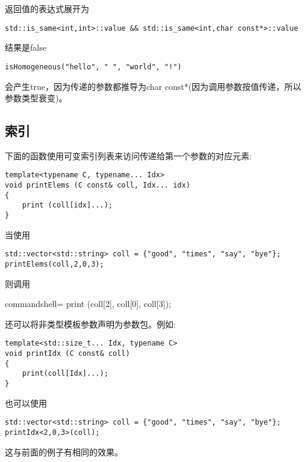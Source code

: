 返回值的表达式展开为

\begin{lstlisting}[style=styleCXX]
std::is_same<int,int>::value && std::is_same<int,char const*>::value
\end{lstlisting}

结果是false

\begin{lstlisting}[style=styleCXX]
isHomogeneous("hello", " ", "world", "!")
\end{lstlisting}

会产生true，因为传递的参数都推导为char const*(因为调用参数按值传递，所以参数类型衰变)。

\subsection{索引}

下面的函数使用可变索引列表来访问传递给第一个参数的对应元素:

\begin{lstlisting}[style=styleCXX]
template<typename C, typename... Idx>
void printElems (C const& coll, Idx... idx)
{
	print (coll[idx]...);
}
\end{lstlisting}

当使用

\begin{lstlisting}[style=styleCXX]
std::vector<std::string> coll = {"good", "times", "say", "bye"};
printElems(coll,2,0,3);
\end{lstlisting}

则调用

\begin{tcblisting}{commandshell={}}
print (coll[2], coll[0], coll[3]);
\end{tcblisting}

还可以将非类型模板参数声明为参数包。例如:

\begin{lstlisting}[style=styleCXX]
template<std::size_t... Idx, typename C>
void printIdx (C const& coll)
{
	print(coll[Idx]...);
}
\end{lstlisting}

也可以使用

\begin{lstlisting}[style=styleCXX]
std::vector<std::string> coll = {"good", "times", "say", "bye"};
printIdx<2,0,3>(coll);
\end{lstlisting}

这与前面的例子有相同的效果。

